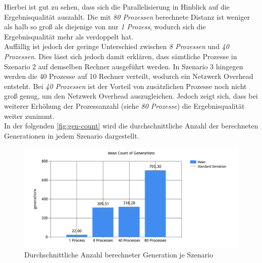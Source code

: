 \documentclass[12pt,a4paper]{scrreprt}
\newcommand{\absatz}{\\[12pt]}
\begin{document}
Hierbei ist gut zu sehen, dass sich die Parallelisierung in Hinblick auf die Ergebnisqualität auszahlt. Die mit \textit{80 Prozessen} berechnete Distanz ist weniger als halb so groß als diejenige von nur \textit{1 Prozess}, wodurch sich die Ergebnisqualität mehr als verdoppelt hat.\\
Auffällig ist jedoch der geringe Unterschied zwischen \textit{8 Prozessen} und \textit{40 Prozessen}. Dies lässt sich jedoch damit erklären, dass sämtliche Prozesse in Szenario 2 auf demselben Rechner ausgeführt werden. In Szenario 3 hingegen werden die 40 Prozesse auf 10 Rechner verteilt, wodurch ein Netzwerk Overhead entsteht. Bei \textit{40 Prozessen} ist der Vorteil von zusätzlichen Prozesse noch nicht groß genug, um den Netzwerk Overhead auszugleichen. Jedoch zeigt sich, dass bei weiterer Erhöhung der Prozessanzahl (siehe \textit{80 Prozesse}) die Ergebnisqualität weiter zunimmt.\absatz
In der folgenden \autoref{fig:gen-count} wird die durchschnittliche Anzahl der berechneten Generationen in jedem Szenario dargestellt.
\pagebreak
\begin{figure}[ht]
  	\centering
	\includegraphics[width=400pt]{images/data_03_gen_count.png}
	\caption{Durchschnittliche Anzahl berechneter Generation je Szenario}
	\label{fig:gen-count}
\end{figure}
\end{document}
